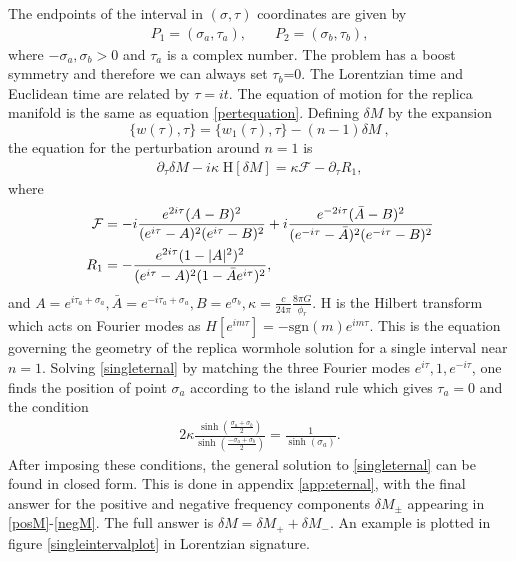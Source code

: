 \documentclass[11pt,oneside,letterpaper]{article}
\newcommand{\f}{\frac}
\newcommand{\be}{\begin{equation}}
\newcommand{\ee}{\end{equation}}
\def\be{\begin{eqnarray}}
\def\ee{\end{eqnarray}}
\let\f=\frac
\let\pa=\partial
\def\be{\begin{equation}}
\def\ee{\end{equation}}
\def\ba{\begin{eqnarray}}
\def\ea{\end{eqnarray}}
\numberwithin{equation}{section}
\def\be{\begin{equation}}
\def\ee{\end{equation}}
\def\ba{\begin{eqnarray}}
\def\ea{\end{eqnarray}}
\def\f {\frac}
\def \be {\begin{equation}}
\def \ee {\end{equation}}
\begin{document}
\begin{spacing}{1.1}
The  endpoints of the interval in $(\sigma, \tau)$ coordinates are given by 
\ba
P_1 = (\sigma_a, \tau_a), \qquad P_2 = (\sigma_b, \tau_b),
\ea
where $-\sigma_a,\sigma_b>0$ and $\tau_a$ is a complex number. The problem has a boost symmetry and therefore we can always set $\tau_b$=0.  The Lorentzian time and Euclidean time are related by $\tau= it$.  The equation of motion for the replica manifold is the same as equation \eqref{pertequation}.  Defining $\delta M$ by the expansion
\be
\{ w(\tau), \tau\} = \{ w_1(\tau), \tau\} - (n-1) \delta M \ ,
\ee
the equation for the perturbation around $n=1$ is
\ba\label{singleternal}
\pa_\tau \delta M - i \kappa \; \text{H}[\delta M] =   \kappa \mathcal{F} -\pa_\tau R_1 ,
\ea
where 
\begin{align}
\mathcal{F} &= - i \frac{e^{2 i\tau} (A-B)^2  }{(e^{i\tau} - A)^2 (e^{i \tau} -B)^2} + i \frac{e^{-2 i\tau} (\bar{A}-B)^2  }{(e^{-i\tau} - \bar{A})^2 (e^{-i \tau} -B)^2} \\
R_1 &= - \f{e^{ 2 i \tau} (1- |A|^2)^2}{(e^{ i \tau} - A)^2 (1- \bar{A} e^{i \tau})^2}, \notag
\end{align}
and $A=e^{i\tau_a+\sigma_a}, \bar{A}= e^{- i \tau_a +\sigma_a}, B= e^{\sigma_b}, \kappa= \frac{c}{24 \pi} \f{8\pi G}{\phi_r}$.   H is the  Hilbert transform which acts on Fourier modes as $H [ e^{ i m \tau}] = - \text{sgn}(m) e^{ i m \tau}$. This is the equation governing the geometry of the replica wormhole solution for a single interval near $n=1$.  Solving \eqref{singleternal} by matching the three Fourier modes $e^{ i \tau}, 1, e^{- i \tau}$, one finds the position of point $\sigma_a$ according to the island rule which gives $\tau_a=0$ and the condition \cite{Almheiri:2019yqk, Almheiri:2019qdq}
\ba\label{QESsingle}
 2 \kappa \f{\sinh(\f{\sigma_a+ \sigma_b}{2})}{\sinh (\f{-\sigma_a+\sigma_b}{2})} = \f{1}{\sinh(\sigma_a)}.
\ea
After imposing these conditions, the general solution to \eqref{singleternal} can be found in closed form. This is done in appendix \ref{app:eternal}, with the final answer for the positive and negative frequency components $\delta M_{\pm}$ appearing in \eqref{posM}-\eqref{negM}. The full answer is $\delta M = \delta M_+ + \delta M_-$. An example is plotted in figure \ref{singleintervalplot} in Lorentzian signature. 



\end{spacing}
\end{document}
